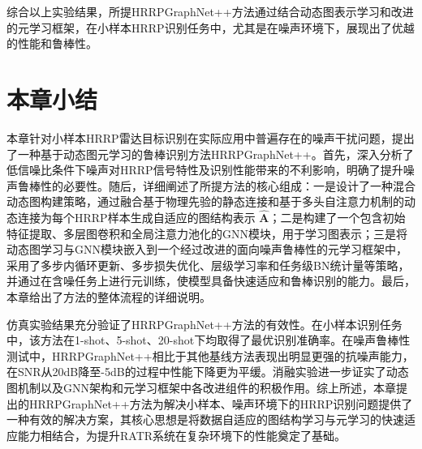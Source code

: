 综合以上实验结果，所提HRRPGraphNet++方法通过结合动态图表示学习和改进的元学习框架，在小样本HRRP识别任务中，尤其是在噪声环境下，展现出了优越的性能和鲁棒性。

\section{本章小结}
\label{sec:noise_summary}

本章针对小样本HRRP雷达目标识别在实际应用中普遍存在的噪声干扰问题，提出了一种基于动态图元学习的鲁棒识别方法HRRPGraphNet++。首先，深入分析了低信噪比条件下噪声对HRRP信号特性及识别性能带来的不利影响，明确了提升噪声鲁棒性的必要性。随后，详细阐述了所提方法的核心组成：一是设计了一种混合动态图构建策略，通过融合基于物理先验的静态连接和基于多头自注意力机制的动态连接为每个HRRP样本生成自适应的图结构表示 $\hat{\mathbf{A}}$；二是构建了一个包含初始特征提取、多层图卷积和全局注意力池化的GNN模块，用于学习图表示；三是将动态图学习与GNN模块嵌入到一个经过改进的面向噪声鲁棒性的元学习框架中，采用了多步内循环更新、多步损失优化、层级学习率和任务级BN统计量等策略，并通过在含噪任务上进行元训练，使模型具备快速适应和鲁棒识别的能力。最后，本章给出了方法的整体流程的详细说明。

仿真实验结果充分验证了HRRPGraphNet++方法的有效性。在小样本识别任务中，该方法在1-shot、5-shot、20-shot下均取得了最优识别准确率。在噪声鲁棒性测试中，HRRPGraphNet++相比于其他基线方法表现出明显更强的抗噪声能力，在SNR从20dB降至-5dB的过程中性能下降更为平缓。消融实验进一步证实了动态图机制以及GNN架构和元学习框架中各改进组件的积极作用。综上所述，本章提出的HRRPGraphNet++方法为解决小样本、噪声环境下的HRRP识别问题提供了一种有效的解决方案，其核心思想是将数据自适应的图结构学习与元学习的快速适应能力相结合，为提升RATR系统在复杂环境下的性能奠定了基础。
